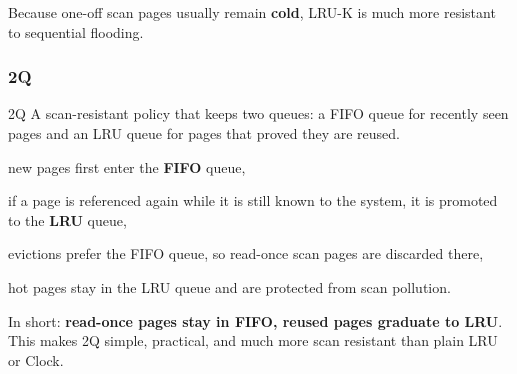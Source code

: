 \documentclass[../../dis.tex]{subfiles}
\begin{document}
Because one-off scan pages usually remain \textbf{cold}, LRU-K is much more resistant to sequential flooding.

\subsubsection*{2Q}
\begin{concept}{2Q}
A scan-resistant policy that keeps two queues: a FIFO queue for recently seen pages and an LRU queue for pages that proved they are reused.
\end{concept}

\begin{dashlist}
    \item new pages first enter the \textbf{FIFO} queue,
    \item if a page is referenced again while it is still known to the system, it is promoted to the \textbf{LRU} queue,
    \item evictions prefer the FIFO queue, so read-once scan pages are discarded there,
    \item hot pages stay in the LRU queue and are protected from scan pollution.
\end{dashlist}

\begin{schema}
{}\par}
\end{schema}

In short: \textbf{read-once pages stay in FIFO, reused pages graduate to LRU}. This makes 2Q simple, practical, and much more scan resistant than plain LRU or Clock.
\end{document}
